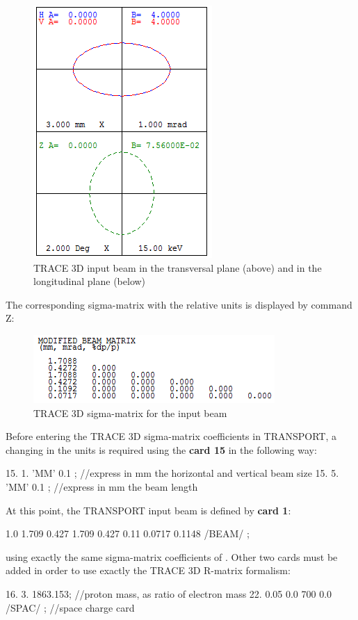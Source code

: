 \begin{figure}[!htb]
 \centering
     \includegraphics[width=0.5\textwidth-0.6cm, keepaspectratio=true]{figures/Benchmarks/Input_Trace.png}
    \caption{TRACE 3D input beam in the transversal plane (above) and in the longitudinal plane (below)}
    \label{fig:Input_TRACE}
\end{figure}
The corresponding sigma-matrix with the relative units is displayed by command Z:
\begin{figure}[!htb]
 \centering
     \includegraphics[width=0.5\textwidth-0.6cm, keepaspectratio=true]{figures/Benchmarks/TRACE_z_input.png}
    \caption{TRACE 3D sigma-matrix for the input beam}
    \label{fig:TRACE_z_Input}
\end{figure}
Before entering the TRACE 3D sigma-matrix coefficients in TRANSPORT, a changing in the units is required using the \textbf{card 15} in the following way:
\begin{example}
15. 1. 'MM' 0.1 ; //express in mm the horizontal and vertical beam size
15. 5. 'MM' 0.1 ; //express in mm the beam length
\end{example}

At this point, the TRANSPORT input beam is defined by \textbf{card 1}:
\begin{example}
1.0 1.709 0.427 1.709 0.427 0.11 0.0717 0.1148 /BEAM/ ;
\end{example}

using exactly the same sigma-matrix coefficients of . Other two cards must be added in order to use exactly the TRACE 3D R-matrix formalism:
\begin{example}
16. 3. 1863.153; //proton mass, as ratio of electron mass
22. 0.05 0.0 700 0.0 /SPAC/ ; //space charge card
\end{example}
